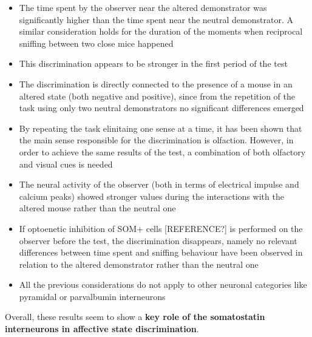 \documentclass[a4paper]{article}
\begin{document}
 \begin{itemize}
 	
 	\item The time spent by the observer near the altered demonstrator was significantly higher than the time spent near the neutral demonstrator. A similar consideration holds for the duration of the moments when reciprocal sniffing between two close mice happened
 	
 	\item This  discrimination appears to be stronger in the first period of the test
 	
 	\item The discrimination is directly connected to the presence of a mouse in an altered state (both negative and positive), since from the repetition of the task using only two neutral demonstrators no significant differences emerged
 	
 	\item By repeating the task elinitaing one sense at a time, it has been shown that the main sense responsible for the discrimination is olfaction. However, in order to achieve the same results of the test, a combination of both olfactory and visual cues is needed
 	
 	
 	\item The neural activity of the observer (both in terms of electrical impulse and  calcium peaks) showed stronger values during the interactions with the altered mouse rather than the neutral one
 	
 	\item If optoenetic inhibition of SOM+ cells [REFERENCE?] is
 	performed on the observer before the test, the discrimination disappears, namely no relevant differences between time spent and sniffing behaviour have been observed in relation to the altered demonstrator rather than the neutral one
 	
 	
 	\item All the previous considerations do not apply to other neuronal categories like pyramidal or parvalbumin interneurons
 	 
 \end{itemize}
 
 Overall, these results seem to show a \textbf{key role of the somatostatin interneurons in affective state discrimination}.
\end{document}
